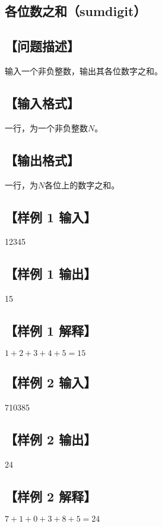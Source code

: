 \documentclass[12pt]{article}
\begin{document}
	\newpage
	\begin{center} \section*{\Large 各位数之和（sumdigit）} \end{center}
	\pagestyle{fancy}
	\fancyhf{}
	
	\subsection*{\normalsize 【问题描述】}
	输入一个非负整数，输出其各位数字之和。
	
	\subsection*{\normalsize 【输入格式】}
	一行，为一个非负整数$N$。
	
	\subsection*{\normalsize 【输出格式】}
	一行，为$N$各位上的数字之和。
	
	\subsection*{\normalsize 【样例 1 输入】}
	12345
	\subsection*{\normalsize 【样例 1 输出】}
	15
	\subsection*{\normalsize 【样例 1 解释】}
	$1+2+3+4+5 = 15$
	
	\subsection*{\normalsize 【样例 2 输入】}
	710385
	\subsection*{\normalsize 【样例 2 输出】}
	24
	\subsection*{\normalsize 【样例 2 解释】}
	$7+1+0+3+8+5 = 24$
\end{document}
